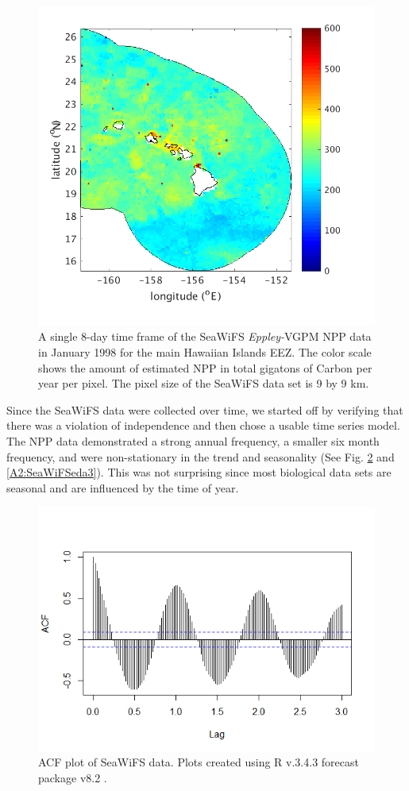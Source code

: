 \documentclass[oneside,12pt,final]{sty/ucthesis-CA2012}
\let\cite\citep                             %
\begin{document}
\begin{mainmatter}
\begin{figure}[H]
     \centering
       \includegraphics[width=.7\textwidth]{fig/SeaWiFSmhi}
    \caption{A single 8-day time frame of the SeaWiFS \textit{Eppley-}VGPM NPP data in January 1998 for the main Hawaiian Islands EEZ. The color scale shows the amount of estimated NPP in total gigatons of Carbon per year per pixel. The pixel size of the SeaWiFS data set is 9 by 9 km.}
    \label{A2:SeaWiFSmhi}
\end{figure}

Since the SeaWiFS data were collected over time, we started off by verifying that there was a violation of independence and then chose a usable time series model. The NPP data demonstrated a strong annual frequency, a smaller six month frequency, and were non-stationary in the trend and seasonality (See Fig. \ref{A2:SeaWiFSeda1}  and \ref{A2:SeaWiFSeda3}). This was not surprising since most biological data sets are seasonal and are influenced by the time of year. 

\begin{figure}[H]
     \centering
       \includegraphics[width=.7\textwidth]{fig/seawifs_acf}
    \caption{ACF plot of SeaWiFS data. Plots created using R v.3.4.3 \cite{Rcite} forecast package v8.2 \cite{forecast1, forecast2}.}
    \label{A2:SeaWiFSeda1}
\end{figure}


\end{mainmatter}
\end{document}
